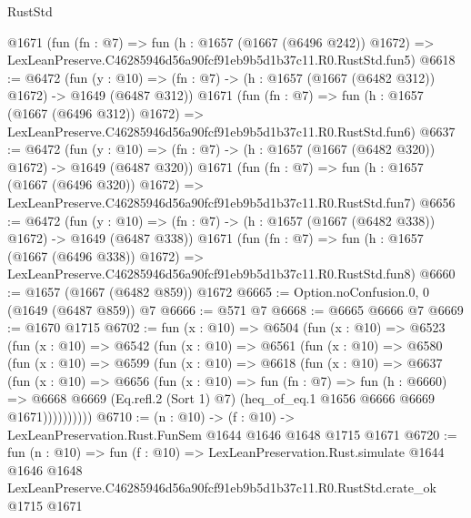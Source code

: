 \begin{lexlean}{RustStd}
\begin{coremodule}
    @1671
    (fun (fn : @7) =>
    fun (h : @1657 (@1667 (@6496 @242)) @1672) =>
    LexLeanPreserve.C46285946d56a90fcf91eb9b5d1b37c11.R0.RustStd.fun5)
@6618 := @6472
    (fun (y : @10) => (fn : @7) -> (h : @1657 (@1667 (@6482 @312)) @1672) -> @1649 (@6487 @312))
    @1671
    (fun (fn : @7) =>
    fun (h : @1657 (@1667 (@6496 @312)) @1672) =>
    LexLeanPreserve.C46285946d56a90fcf91eb9b5d1b37c11.R0.RustStd.fun6)
@6637 := @6472
    (fun (y : @10) => (fn : @7) -> (h : @1657 (@1667 (@6482 @320)) @1672) -> @1649 (@6487 @320))
    @1671
    (fun (fn : @7) =>
    fun (h : @1657 (@1667 (@6496 @320)) @1672) =>
    LexLeanPreserve.C46285946d56a90fcf91eb9b5d1b37c11.R0.RustStd.fun7)
@6656 := @6472
    (fun (y : @10) => (fn : @7) -> (h : @1657 (@1667 (@6482 @338)) @1672) -> @1649 (@6487 @338))
    @1671
    (fun (fn : @7) =>
    fun (h : @1657 (@1667 (@6496 @338)) @1672) =>
    LexLeanPreserve.C46285946d56a90fcf91eb9b5d1b37c11.R0.RustStd.fun8)
@6660 := @1657 (@1667 (@6482 @859)) @1672
@6665 := Option.noConfusion.{0, 0} (@1649 (@6487 @859)) @7
@6666 := @571 @7
@6668 := @6665 @6666 @7
@6669 := @1670 @1715
@6702 := fun (x : @10) =>
  @6504
    (fun (x : @10) =>
    @6523
      (fun (x : @10) =>
      @6542
        (fun (x : @10) =>
        @6561
          (fun (x : @10) =>
          @6580
            (fun (x : @10) =>
            @6599
              (fun (x : @10) =>
              @6618
                (fun (x : @10) =>
                @6637
                  (fun (x : @10) =>
                  @6656
                    (fun (x : @10) =>
                    fun (fn : @7) =>
                    fun (h : @6660) =>
                    @6668
                      @6669
                      (Eq.refl.{2} (Sort 1) @7)
                      (heq_of_eq.{1} @1656 @6666 @6669 @1671))))))))))
@6710 := (n : @10) -> (f : @10) -> LexLeanPreservation.Rust.FunSem @1644 @1646 @1648 @1715 @1671
@6720 := fun (n : @10) =>
  fun (f : @10) =>
  LexLeanPreservation.Rust.simulate
    @1644
    @1646
    @1648
    LexLeanPreserve.C46285946d56a90fcf91eb9b5d1b37c11.R0.RustStd.crate_ok
    @1715
    @1671
\end{coremodule}
\end{lexlean}
